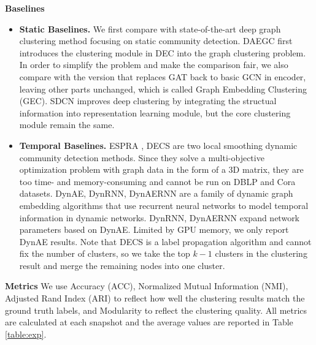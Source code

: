\documentclass[letterpaper]{article} %
\begin{document}
\noindent\textbf{Baselines}

\begin{itemize}
    \item \textbf{Static Baselines.} We first compare with state-of-the-art deep graph clustering method focusing on static community detection. DAEGC \cite{wang2019attributedDAEGC} first introduces the clustering module in DEC \cite{xie2016unsupervisedDEC} into the graph clustering problem. In order to simplify the problem and make the comparison fair, we also compare with the version that replaces GAT back to basic GCN in encoder, leaving other parts unchanged, which is called Graph Embedding Clustering (GEC). SDCN \cite{bo2020structural} improves deep clustering by integrating the structual information into representation learning module, but the core clustering module remain the same. %
    \item \textbf{Temporal Baselines.} ESPRA \cite{espra}, DECS \cite{liu2020detecting} are two local smoothing dynamic community detection methods. Since they solve a multi-objective optimization problem with graph data in the form of a 3D matrix, they are too time- and memory-consuming and cannot be run on DBLP and Cora datasets. DynAE, DynRNN, DynAERNN \cite{goyal2020dyngraph2vec} are a family of dynamic graph embedding algorithms that use recurrent neural networks to model temporal information in dynamic networks. DynRNN, DynAERNN expand network parameters based on DynAE. Limited by GPU memory, we only report DynAE results. Note that DECS is a label propagation algorithm and cannot fix the number of clusters, so we take the top $k-1$ clusters in the clustering result and merge the remaining nodes into one cluster. %
\end{itemize}


\noindent\textbf{Metrics}  We use Accuracy (ACC), Normalized Mutual Information (NMI), Adjusted Rand Index (ARI) to reflect how well the clustering results match the ground truth labels, and Modularity to reflect the clustering quality. All metrics are calculated at each snapshot and the average values are reported in Table \ref{table:exp}.
\end{document}
